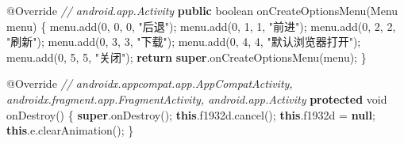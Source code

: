 \documentclass[
]{article}
\newenvironment{Shaded}{}{}
\newcommand{\AttributeTok}[1]{\textcolor[rgb]{0.49,0.56,0.16}{#1}}
\newcommand{\BuiltInTok}[1]{\textcolor[rgb]{0.00,0.50,0.00}{#1}}
\newcommand{\CommentTok}[1]{\textcolor[rgb]{0.38,0.63,0.69}{\textit{#1}}}
\newcommand{\ControlFlowTok}[1]{\textcolor[rgb]{0.00,0.44,0.13}{\textbf{#1}}}
\newcommand{\DataTypeTok}[1]{\textcolor[rgb]{0.56,0.13,0.00}{#1}}
\newcommand{\DecValTok}[1]{\textcolor[rgb]{0.25,0.63,0.44}{#1}}
\newcommand{\FunctionTok}[1]{\textcolor[rgb]{0.02,0.16,0.49}{#1}}
\newcommand{\KeywordTok}[1]{\textcolor[rgb]{0.00,0.44,0.13}{\textbf{#1}}}
\newcommand{\NormalTok}[1]{#1}
\newcommand{\OperatorTok}[1]{\textcolor[rgb]{0.40,0.40,0.40}{#1}}
\newcommand{\StringTok}[1]{\textcolor[rgb]{0.25,0.44,0.63}{#1}}
\begin{document}
\begin{Shaded}
\begin{Highlighting}[]
    \AttributeTok{@Override} \CommentTok{// android.app.Activity}
    \KeywordTok{public} \DataTypeTok{boolean} \FunctionTok{onCreateOptionsMenu}\OperatorTok{(}\BuiltInTok{Menu}\NormalTok{ menu}\OperatorTok{)} \OperatorTok{\{}
\NormalTok{        menu}\OperatorTok{.}\FunctionTok{add}\OperatorTok{(}\DecValTok{0}\OperatorTok{,} \DecValTok{0}\OperatorTok{,} \DecValTok{0}\OperatorTok{,} \StringTok{"后退"}\OperatorTok{);}
\NormalTok{        menu}\OperatorTok{.}\FunctionTok{add}\OperatorTok{(}\DecValTok{0}\OperatorTok{,} \DecValTok{1}\OperatorTok{,} \DecValTok{1}\OperatorTok{,} \StringTok{"前进"}\OperatorTok{);}
\NormalTok{        menu}\OperatorTok{.}\FunctionTok{add}\OperatorTok{(}\DecValTok{0}\OperatorTok{,} \DecValTok{2}\OperatorTok{,} \DecValTok{2}\OperatorTok{,} \StringTok{"刷新"}\OperatorTok{);}
\NormalTok{        menu}\OperatorTok{.}\FunctionTok{add}\OperatorTok{(}\DecValTok{0}\OperatorTok{,} \DecValTok{3}\OperatorTok{,} \DecValTok{3}\OperatorTok{,} \StringTok{"下载"}\OperatorTok{);}
\NormalTok{        menu}\OperatorTok{.}\FunctionTok{add}\OperatorTok{(}\DecValTok{0}\OperatorTok{,} \DecValTok{4}\OperatorTok{,} \DecValTok{4}\OperatorTok{,} \StringTok{"默认浏览器打开"}\OperatorTok{);}
\NormalTok{        menu}\OperatorTok{.}\FunctionTok{add}\OperatorTok{(}\DecValTok{0}\OperatorTok{,} \DecValTok{5}\OperatorTok{,} \DecValTok{5}\OperatorTok{,} \StringTok{"关闭"}\OperatorTok{);}
        \ControlFlowTok{return} \KeywordTok{super}\OperatorTok{.}\FunctionTok{onCreateOptionsMenu}\OperatorTok{(}\NormalTok{menu}\OperatorTok{);}
    \OperatorTok{\}}

    \AttributeTok{@Override} \CommentTok{// androidx.appcompat.app.AppCompatActivity, androidx.fragment.app.FragmentActivity, android.app.Activity}
    \KeywordTok{protected} \DataTypeTok{void} \FunctionTok{onDestroy}\OperatorTok{()} \OperatorTok{\{}
        \KeywordTok{super}\OperatorTok{.}\FunctionTok{onDestroy}\OperatorTok{();}
        \KeywordTok{this}\OperatorTok{.}\FunctionTok{f1932d}\OperatorTok{.}\FunctionTok{cancel}\OperatorTok{();}
        \KeywordTok{this}\OperatorTok{.}\FunctionTok{f1932d} \OperatorTok{=} \KeywordTok{null}\OperatorTok{;}
        \KeywordTok{this}\OperatorTok{.}\FunctionTok{e}\OperatorTok{.}\FunctionTok{clearAnimation}\OperatorTok{();}
    \OperatorTok{\}}


\end{Highlighting}
\end{Shaded}
\end{document}
